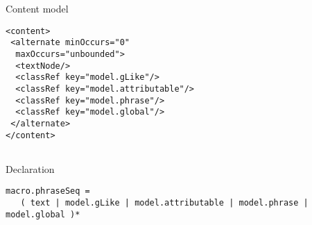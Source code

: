 \begin{reflist}
    \item[{Content model}]
  \mbox{}\hfill\\[-10pt]\begin{Verbatim}[fontsize=\small]
<content>
 <alternate minOccurs="0"
  maxOccurs="unbounded">
  <textNode/>
  <classRef key="model.gLike"/>
  <classRef key="model.attributable"/>
  <classRef key="model.phrase"/>
  <classRef key="model.global"/>
 </alternate>
</content>
    
\end{Verbatim}

    \item[{Declaration}]
  \mbox{}\hfill\\[-10pt]\begin{Verbatim}[fontsize=\small]
macro.phraseSeq =
   ( text | model.gLike | model.attributable | model.phrase | model.global )*
\end{Verbatim}

\end{reflist}  
